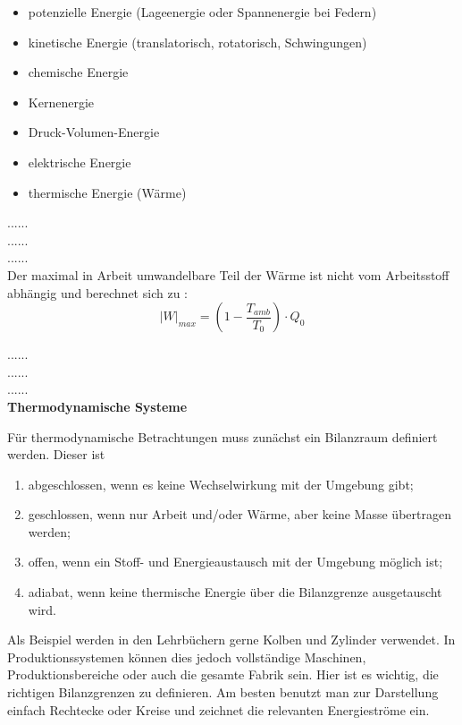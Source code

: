 \begin{itemize}																	%
	\item{potenzielle Energie (Lageenergie oder Spannenergie bei Federn)}
	\item{kinetische Energie (translatorisch, rotatorisch, Schwingungen)}
	\item{chemische Energie}
	\item{Kernenergie}
	\item{Druck-Volumen-Energie}
	\item{elektrische Energie}
	\item{thermische Energie (Wärme)}
\end{itemize}

......\\
......\\
......\\

Der maximal in Arbeit umwandelbare Teil der Wärme ist nicht vom Arbeitsstoff abhängig und berechnet sich zu \parencite[S. 153ff]{Labuhn.2009}:
\begin{equation}																						%
		{|W|}_{max} = (1-\frac{{T}_{amb}}{T_0}) \cdot Q_0				%
		\label{eq:W_max}
\end{equation}

\clearpage

......\\
......\\
......\\

\textbf{Thermodynamische Systeme}\par
Für thermodynamische Betrachtungen muss zunächst ein Bilanzraum definiert werden. Dieser ist 
\begin{enumerate}
\item abgeschlossen, wenn es keine Wechselwirkung mit der Umgebung gibt;
\item geschlossen, wenn nur Arbeit und/oder Wärme, aber keine Masse übertragen werden;
\item offen, wenn ein Stoff- und Energieaustausch mit der Umgebung möglich ist;
\item adiabat, wenn keine thermische Energie über die Bilanzgrenze ausgetauscht wird.
\end{enumerate}

Als Beispiel werden in den Lehrbüchern gerne Kolben und Zylinder verwendet. In Produktionssystemen können dies jedoch vollständige Maschinen, Produktionsbereiche oder auch die gesamte Fabrik sein. Hier ist es wichtig, die richtigen Bilanzgrenzen zu definieren. Am besten benutzt man zur Darstellung einfach Rechtecke oder Kreise und zeichnet die relevanten Energieströme ein.\par\bigskip

